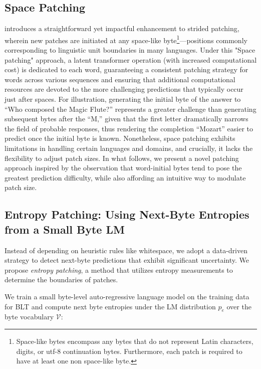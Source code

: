 \subsection{Space Patching}
\label{section:white-patch}

\citet{slagle2024spacebyte} introduces a straightforward yet impactful enhancement to strided patching, wherein new patches are initiated at any space-like byte\footnote{
    Space-like bytes encompass any bytes that do not represent Latin characters, digits, or utf-8 continuation bytes. Furthermore, each patch is required to have at least one non space-like byte. }—positions commonly corresponding to linguistic unit boundaries in many languages. Under this "Space patching" approach, a latent transformer operation (with increased computational cost) is dedicated to each word, guaranteeing a consistent patching strategy for words across various sequences and ensuring that additional computational resources are devoted to the more challenging predictions that typically occur just after spaces. For illustration, generating the initial byte of the answer to ``Who composed the Magic Flute?\uline{\hspace{.6em}}'' represents a greater challenge than generating subsequent bytes after the ``M,'' given that the first letter dramatically narrows the field of probable responses, thus rendering the completion ``Mozart'' easier to predict once the initial byte is known. Nonetheless, space patching exhibits limitations in handling certain languages and domains, and crucially, it lacks the flexibility to adjust patch sizes. In what follows, we present a novel patching approach inspired by the observation that word-initial bytes tend to pose the greatest prediction difficulty, while also affording an intuitive way to modulate patch size.

\subsection{Entropy Patching: Using Next-Byte Entropies from a Small Byte LM}
\label{section:dyn-patch}

Instead of depending on heuristic rules like whitespace, we adopt a data-driven strategy to detect next-byte predictions that exhibit significant uncertainty. We propose \textit{entropy patching}, a method that utilizes entropy measurements to determine the boundaries of patches.

We train a small byte-level auto-regressive language model on the training data for {\textsc BLT} and compute next byte entropies under the LM distribution $p_{e}$ over the byte vocabulary $\mathcal{V}$:

